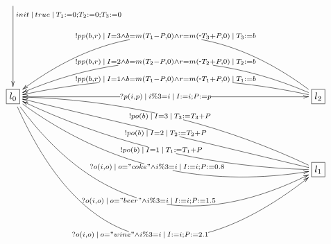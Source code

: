 $\xymatrix{
   \ar[ddd]^<<<<{init\:|\:true\:|\:T_1:=0;T_2:=0;T_3:=0} \\ \\ \\
   \fbox{$l_0$} \ar[rrrrrrrrrr]|{?p(i, p)\:|\:i\%3=i\:|\:I:=i; P:=p} \ar@/_3pc/[ddrrrrrrrrrr]|{?o(i,o)\:|\:o="coke"\land i\%3=i\:|\:I:=i; P:=0.8} \ar@/_6pc/[ddrrrrrrrrrr]|{?o(i,o)\:|\:o="beer"\land i\%3=i\:|\:I:=i; P:=1.5} \ar@/_9pc/[ddrrrrrrrrrr]|{?o(i,o)\:|\:o="wine"\land i\%3=i\:|\:I:=i; P:=2.1} &&&&&&&&&& \fbox{$l_2$} \ar@/_1.5pc/[llllllllll]|{!pp(b, r)\:|\:I=1\land b=m(T_1-P,0)\land r=m(\scalebox{0.75}[1.0]{-}T_1+P,0)\:|\:T_1:=b} \ar@/_3pc/[llllllllll]|{!pp(b, r)\:|\:I=2\land b=m(T_2-P,0)\land r=m(\scalebox{0.75}[1.0]{-}T_2+P,0)\:|\:T_2:=b} \ar@/_5.2pc/[llllllllll]|{!pp(b, r)\:|\:I=3\land b=m(T_1-P,0)\land r=m(\scalebox{0.75}[1.0]{-}T_3+P,0)\:|\:T_3:=b} \\ \\
   &&&&&&&&&& \fbox{$l_1$} \ar@/^1.5pc/[uullllllllll]|{!po(b)\:|\:I=1\:|\:T_1:=T_1+P} \ar[uullllllllll]|{!po(b)\:|\:I=2\:|\:T_2:=T_2+P} \ar@/_1.5pc/[uullllllllll]|{!po(b)\:|\:I=3\:|\:T_3:=T_3+P} 
}$

